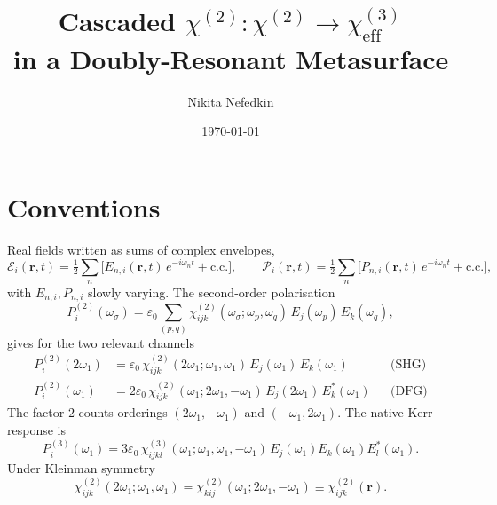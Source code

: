 \documentclass[11pt,a4paper]{article}
\newcommand{\eps}{\varepsilon}
\newcommand{\bvec}[1]{\mathbf{#1}}
\newcommand{\ri}{\bvec{r}}
\newcommand{\chitwo}{\chi^{(2)}}
\newcommand{\chithree}{\chi^{(3)}}
\begin{document}
\title{Cascaded $\chi^{(2)}{:}\chi^{(2)} \to \chi^{(3)}_\text{eff}$ \\
       in a Doubly-Resonant Metasurface\\[2pt]
       }
\author{Nikita Nefedkin}
\date{\today}
\maketitle

\section{Conventions}\label{sec:conventions}

Real fields written as sums of complex envelopes,
\begin{equation}
  \mathcal{E}_i(\ri,t)=\tfrac12\sum_n\!\bigl[E_{n,i}(\ri,t)\,e^{-i\omega_n t}+\mathrm{c.c.}\bigr],\qquad
  \mathcal{P}_i(\ri,t)=\tfrac12\sum_n\!\bigl[P_{n,i}(\ri,t)\,e^{-i\omega_n t}+\mathrm{c.c.}\bigr],
\end{equation}
with $E_{n,i},P_{n,i}$ slowly varying. The second-order polarisation
\begin{equation}
  P_i^{(2)}(\omega_\sigma)=\eps_0\!\!\sum_{(p,q)}\!\chitwo_{ijk}(\omega_\sigma;\omega_p,\omega_q)\,E_j(\omega_p)\,E_k(\omega_q),
\end{equation}
gives for the two relevant channels
\begin{align}
  P_i^{(2)}(2\omega_1)&=\eps_0\,\chitwo_{ijk}(2\omega_1;\omega_1,\omega_1)\,E_j(\omega_1)\,E_k(\omega_1) &&\text{(SHG)}\label{eq:PSHG}\\
  P_i^{(2)}(\omega_1)&=2\eps_0\,\chitwo_{ijk}(\omega_1;2\omega_1,-\omega_1)\,E_j(2\omega_1)\,E_k^*(\omega_1) &&\text{(DFG)}\label{eq:PDFG}
\end{align}
The factor $2$ counts orderings $(2\omega_1,-\omega_1)$ and $(-\omega_1,2\omega_1)$. The native Kerr response is
\begin{equation}
  P_i^{(3)}(\omega_1)=3\eps_0\,\chithree_{ijkl}(\omega_1;\omega_1,\omega_1,-\omega_1)\,
                     E_j(\omega_1)E_k(\omega_1)E_l^*(\omega_1).
\end{equation}
Under Kleinman symmetry
\begin{equation}
  \chitwo_{ijk}(2\omega_1;\omega_1,\omega_1)=\chitwo_{kij}(\omega_1;2\omega_1,-\omega_1)\equiv\chitwo_{ijk}(\ri).
\end{equation}
\end{document}
